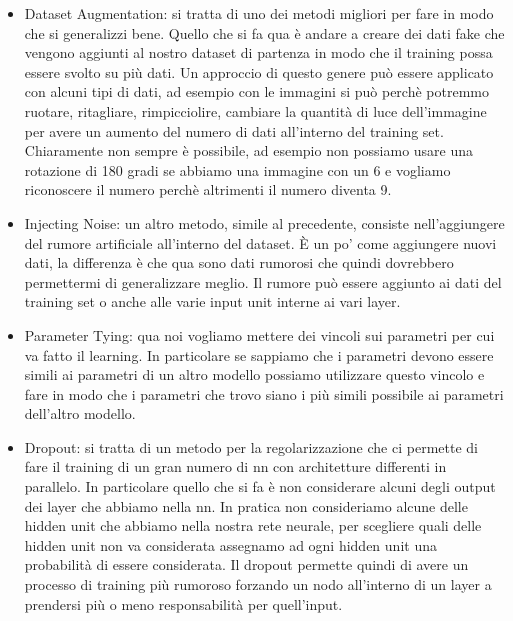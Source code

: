 \documentclass[14pt]{extreport}
\begin{document}
\begin{itemize}
	\item Dataset Augmentation: si tratta di uno dei metodi migliori per fare in modo che si generalizzi bene. Quello che si fa qua è andare a creare
	      dei dati fake che vengono aggiunti al nostro dataset di partenza in modo che il training possa essere svolto su più dati. Un approccio di
	      questo genere può essere applicato con alcuni tipi di dati, ad esempio con le immagini si può perchè potremmo ruotare, ritagliare,
	      rimpicciolire, cambiare la quantità di luce dell'immagine per avere un aumento del numero di dati all'interno del training set. Chiaramente
	      non sempre è possibile, ad esempio non possiamo usare una rotazione di 180 gradi se abbiamo una immagine con un 6 e vogliamo riconoscere il
	      numero perchè altrimenti il numero diventa 9.
	\item Injecting Noise: un altro metodo, simile al precedente, consiste nell'aggiungere del rumore artificiale all'interno del dataset. È un po'
	      come aggiungere nuovi dati, la differenza è che qua sono dati rumorosi che quindi dovrebbero permettermi di generalizzare meglio. Il rumore
	      può essere aggiunto ai dati del training set o anche alle varie input unit interne ai vari layer.
	\item Parameter Tying: qua noi vogliamo mettere dei vincoli sui parametri per cui va fatto il learning. In particolare se sappiamo che i parametri
	      devono essere simili ai parametri di un altro modello possiamo utilizzare questo vincolo e fare in modo che i parametri che trovo siano i
	      più simili possibile ai parametri dell'altro modello.
	\item Dropout: si tratta di un metodo per la regolarizzazione che ci permette di fare il training di un gran numero di nn con architetture
	      differenti in parallelo. In particolare quello che si fa è non considerare alcuni degli output dei layer che abbiamo nella nn. In pratica
	      non consideriamo alcune delle hidden unit che abbiamo nella nostra rete neurale, per scegliere quali delle hidden unit non va considerata
	      assegnamo ad ogni hidden unit una probabilità di essere considerata. Il dropout permette quindi di avere un processo di training più
	      rumoroso forzando un nodo all'interno di un layer a prendersi più o meno responsabilità per quell'input.
	      \begin{figure}[H]
		      \centering

\end{figure}
\end{itemize}
\end{document}
